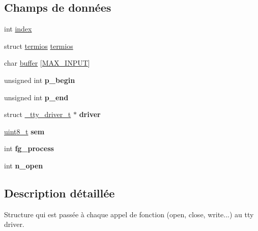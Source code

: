 \subsection*{Champs de données}
\begin{DoxyCompactItemize}
\item 
int \hyperlink{struct__tty__struct__t_a4208e736cfcd8e0b00a3c0bbfe4674f7}{index}
\item 
struct \hyperlink{structtermios}{termios} \hyperlink{struct__tty__struct__t_a39471b82fd4e3a235744e73775ac2523}{termios}
\item 
char \hyperlink{struct__tty__struct__t_ace735f0fca7a2e1c4c75f6ffb9223b19}{buffer} \mbox{[}\hyperlink{tty_8h_a00c1f0e7816626f58349492ef0720b5f}{M\+A\+X\+\_\+\+I\+N\+P\+U\+T}\mbox{]}
\item 
\hypertarget{struct__tty__struct__t_ae136497684ded03f21999f2239b3b67c}{unsigned int {\bfseries p\+\_\+begin}}\label{struct__tty__struct__t_ae136497684ded03f21999f2239b3b67c}

\item 
\hypertarget{struct__tty__struct__t_a437e8f9f913784a7f60cf95af3917b23}{unsigned int {\bfseries p\+\_\+end}}\label{struct__tty__struct__t_a437e8f9f913784a7f60cf95af3917b23}

\item 
\hypertarget{struct__tty__struct__t_a10847c2c12b0a9e131f107ec9dbe65f8}{struct \hyperlink{struct__tty__driver__t}{\+\_\+tty\+\_\+driver\+\_\+t} $\ast$ {\bfseries driver}}\label{struct__tty__struct__t_a10847c2c12b0a9e131f107ec9dbe65f8}

\item 
\hypertarget{struct__tty__struct__t_ac5522c658c4a0e142e85142432fa44fe}{\hyperlink{kernel_2include_2types_8h_aba7bc1797add20fe3efdf37ced1182c5}{uint8\+\_\+t} {\bfseries sem}}\label{struct__tty__struct__t_ac5522c658c4a0e142e85142432fa44fe}

\item 
\hypertarget{struct__tty__struct__t_ad017c8b00079444a966de0a0d31b1dd7}{int {\bfseries fg\+\_\+process}}\label{struct__tty__struct__t_ad017c8b00079444a966de0a0d31b1dd7}

\item 
\hypertarget{struct__tty__struct__t_a31c54deea3b926404682b196eb366966}{int {\bfseries n\+\_\+open}}\label{struct__tty__struct__t_a31c54deea3b926404682b196eb366966}

\end{DoxyCompactItemize}


\subsection{Description détaillée}
Structure qui est passée à chaque appel de fonction (open, close, write...) au tty driver. 

